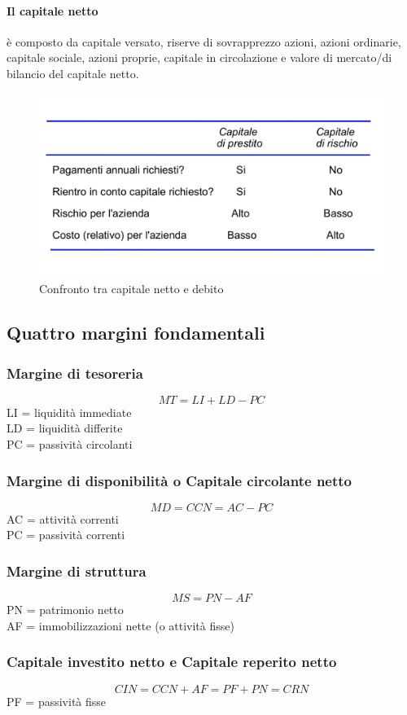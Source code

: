 \documentclass{report}
\begin{document}
	\paragraph{Il capitale netto} è composto da capitale versato, riserve di sovrapprezzo azioni, azioni ordinarie, capitale sociale, azioni proprie, capitale in circolazione e valore di mercato/di bilancio del capitale netto.
	\begin{figure}[h]
		\centering
		\includegraphics[width=0.7\linewidth]{confronto-capitali}
		\caption{Confronto tra capitale netto e debito}
		\label{fig:confronto-capitali}
	\end{figure}
	\subsection{Quattro margini fondamentali}
	\subsubsection{Margine di tesoreria}
	\[MT = LI + LD - PC\]
	LI = liquidità immediate\\LD = liquidità differite\\PC = passività circolanti
	\subsubsection{Margine di disponibilità o Capitale circolante netto}
	\[MD = CCN = AC - PC\]
	AC = attività correnti\\PC = passività correnti
	\subsubsection{Margine di struttura}
	\[MS = PN - AF\]
	PN = patrimonio netto\\AF = immobilizzazioni nette (o attività fisse)
	\subsubsection{Capitale investito netto e Capitale reperito netto}
	\[CIN = CCN + AF = PF + PN = CRN\]
	PF = passività fisse
\end{document}
